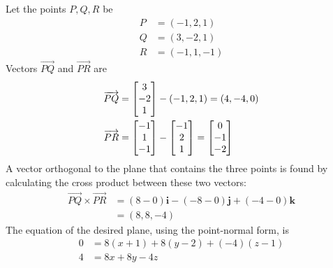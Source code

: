 %
%

\item 
{}
\BEN
\item
Let the points $P, Q, R$ be \\
\begin{align*}
P &=(-1,2,1)\\
Q &=(3,-2,1)\\
R &=(-1,1,-1)
\end{align*}
Vectors  $\overrightarrow{PQ}$ and $\overrightarrow{PR}$ are
\begin{align*}
\overrightarrow{PQ} &= \begin{bmatrix} 3 \\ -2 \\ 1 \end{bmatrix} -(-1,2,1) = (4,-4,0)\\
\overrightarrow{PR} &= \begin{bmatrix} -1 \\ 1 \\ -1 \end{bmatrix} - \begin{bmatrix} -1 \\ 2 \\ 1 \end{bmatrix} = \begin{bmatrix} 0 \\ -1 \\ -2\end{bmatrix}
\end{align*}
A vector orthogonal to the plane that contains the three points is found by calculating the cross product between these two vectors:
\begin{align*}
\overrightarrow{PQ} \times \overrightarrow{PR} 
&= (8-0)\mathbf{i} - (-8-0)\mathbf{j}+(-4-0)\mathbf{k} \\
&=(8,8,-4)
\end{align*}
The equation of the desired plane, using the point-normal form, is
\begin{align*}
0&=8(x+1)+8(y-2)+(-4)(z-1)\\
4&=8x + 8y -4z
\end{align*}

